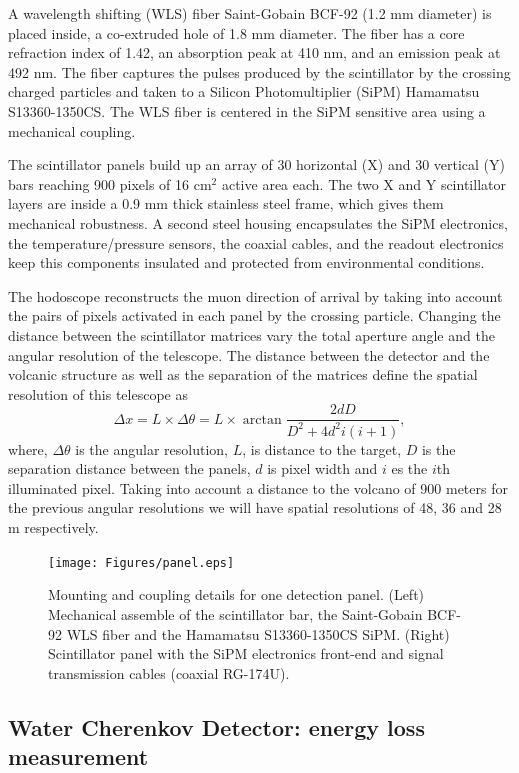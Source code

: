 \documentclass[letterpaper,11pt]{article}
\begin{document}
A wavelength shifting (WLS) fiber Saint-Gobain BCF-92 (1.2 mm diameter) is placed inside, a co-extruded hole of 1.8 mm diameter. The fiber has a core refraction index of 1.42, an absorption peak at 410 nm, and an emission peak at 492 nm. The fiber captures the pulses produced by the scintillator by the crossing charged particles and taken to a Silicon Photomultiplier (SiPM) Hamamatsu S13360-1350CS. The WLS fiber is centered in the SiPM sensitive area using a mechanical coupling.

The scintillator panels build up an array of 30 horizontal (X) and 30 vertical (Y) bars reaching 900 pixels of 16 cm$^2$ active area each. The two X and Y scintillator layers are inside a 0.9 mm thick stainless steel frame, which gives them mechanical robustness. A second steel housing encapsulates the SiPM electronics,  the temperature/pressure sensors, the coaxial cables, and the readout electronics keep this components insulated and protected from environmental conditions. 

The hodoscope reconstructs the muon direction of arrival by taking into account the pairs of pixels activated in each panel by the crossing particle. Changing the distance between the scintillator matrices vary the total aperture angle and the angular resolution of the telescope. The distance between the detector and the volcanic structure as well as the separation of the matrices define the spatial resolution of this telescope as
\begin{equation}
\Delta x=L\times\Delta\theta=L\times \arctan{\frac{2dD}{D^2+4d^2i(i+1)}},
\end{equation}
where, $\Delta\theta$ is the angular resolution, $L$, is distance to the target, $D$ is the separation distance between the panels, $d$ is pixel width and $i$ es the $i$th illuminated pixel. Taking into account a distance to the volcano of 900 meters for the previous angular resolutions we will have spatial resolutions of 48, 36 and 28 m respectively.

\begin{figure}[htb]
\centering
\texttt{[image: Figures/panel.eps]}
\caption{Mounting and coupling details for one detection panel. (Left) Mechanical assemble of the scintillator bar, the Saint-Gobain BCF-92 WLS fiber and the Hamamatsu S13360-1350CS SiPM. (Right) Scintillator panel with the SiPM electronics front-end and signal transmission cables (coaxial RG-174U).}
\label{fig:frame}
\end{figure}

\subsection{Water Cherenkov Detector: energy loss measurement}
\end{document}

